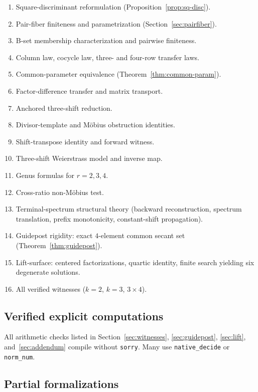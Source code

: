 \documentclass[11pt,a4paper]{article}
\theoremstyle{definition}
\theoremstyle{remark}
\begin{document}
\begin{enumerate}[nosep]
\item Square-discriminant reformulation (Proposition~\ref{prop:sq-disc}).
\item Pair-fiber finiteness and parametrization (Section~\ref{sec:pairfiber}).
\item B-set membership characterization and pairwise finiteness.
\item Column law, cocycle law, three- and four-row transfer laws.
\item Common-parameter equivalence (Theorem~\ref{thm:common-param}).
\item Factor-difference transfer and matrix transport.
\item Anchored three-shift reduction.
\item Divisor-template and M\"obius obstruction identities.
\item Shift-transpose identity and forward witness.
\item Three-shift Weierstrass model and inverse map.
\item Genus formulas for $r=2,3,4$.
\item Cross-ratio non-M\"obius test.
\item Terminal-spectrum structural theory (backward reconstruction,
      spectrum translation, prefix monotonicity, constant-shift
      propagation).
\item Guidepost rigidity: exact $4$-element common secant set
      (Theorem~\ref{thm:guidepost}).
\item Lift-surface: centered factorizations, quartic identity, finite
      search yielding six degenerate solutions.
\item All verified witnesses ($k=2$, $k=3$, $3\times 4$).
\end{enumerate}

\subsection{Verified explicit computations}

All arithmetic checks listed in Section~\ref{sec:witnesses},
\ref{sec:guidepost}, \ref{sec:lift}, and~\ref{sec:addendum} compile
without \texttt{sorry}.  Many use \texttt{native\_decide} or
\texttt{norm\_num}.

\subsection{Partial formalizations}
\end{document}
